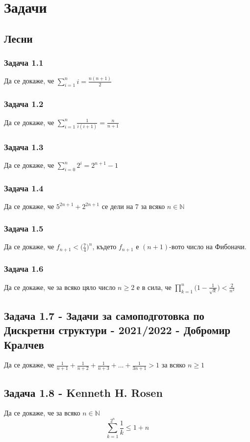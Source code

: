 \documentclass[12pt]{article}
\begin{document}
\section*{Задачи}

\subsection*{Лесни}
\subsubsection*{Задача 1.1}
Да се докаже, че $\displaystyle\sum_{i=1}^{n} i = \frac{n(n+1)}{2}$
\subsubsection*{Задача 1.2}
Да се докаже, че $\displaystyle\sum_{i=1}^{n} \frac{1}{i(i+1)} = \frac{n}{n+1}$
\subsubsection*{Задача 1.3}
Да се докаже, че $\displaystyle\sum_{i=0}^{n} 2^i = 2^{n+1} - 1$
\subsubsection*{Задача 1.4}
Да се докаже, че $5^{2n + 1} + 2^{2n+1}$ се дели на $7$ за всяко $n \in \mathbb{N}$
\subsubsection*{Задача 1.5}
Да се докаже, че $f_{n+1} < \biggl( \frac{7}{4} \biggr)^n$, където $f_{n+1}$ е $(n+1)$-вото число на Фибоначи.
\subsubsection*{Задача 1.6}
Да се докаже, че за всяко цяло число $n \geq 2$ е в сила, че $\displaystyle\prod_{k=1}^n \biggl(1 - \frac{1}{\sqrt{k}}\biggr) < \frac{2}{n^2}$
\subsection*{Задача 1.7 - Задачи за самоподготовка по Дискретни структури - 2021/2022 - Добромир Кралчев}
Да се докаже, че $\frac{1}{n+1} + \frac{1}{n+2} + \frac{1}{n+3} + ... + \frac{1}{3n + 1} > 1$ за всяко $n \geq 1$
\subsection*{Задача 1.8 - Kenneth H. Rosen}
Да се докаже, че за всяко $n \in \mathbb{N}$
\begin{equation*}
    \displaystyle\sum_{k=1}^{2^n} \frac{1}{k} \leq 1 + n
\end{equation*}
\end{document}
